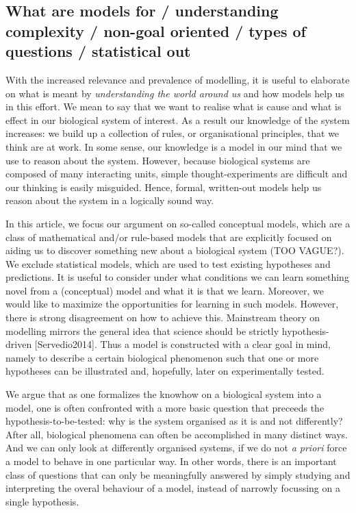\subsection{What are models for / understanding complexity / non-goal oriented / types of questions / statistical out}

With the increased relevance and prevalence of modelling, it is useful to elaborate on what is meant by \emph{understanding the world around us} and how models help us in this effort. We mean to say that we want to realise what is cause and what is effect in our biological system of interest. As a result our knowledge of the system increases: we build up a collection of rules, or organisational principles, that we think are at work. In some sense, our knowledge is a model in our mind that we use to reason about the system. However, because biological systems are composed of many interacting units, simple thought-experiments are difficult and our thinking is easily misguided. Hence, formal, written-out models help us reason about the system in a logically sound way.

In this article, we focus our argument on so-called conceptual models, which are a class of mathematical and/or rule-based models that are explicitly focused on aiding us to discover something new about a biological system (TOO VAGUE?). We exclude statistical models, which are used to test existing hypotheses and predictions. It is useful to consider under what conditions we can learn something novel from a (conceptual) model and what it is that we learn. Moreover, we would like to maximize the opportunities for learning in such models. However, there is strong disagreement on how to achieve this. Mainstream theory on modelling mirrors the general idea that science should be strictly hypothesis-driven [Servedio2014]. Thus a model is constructed with a clear goal in mind, namely to describe a certain biological phenomenon such that one or more hypotheses can be illustrated and, hopefully, later on experimentally tested.

We argue that as one formalizes the knowhow on a biological system into a model, one is often confronted with a more basic question that preceeds the hypothesis-to-be-tested: why is the system organised as it is and not differently? After all, biological phenomena can often be accomplished in many distinct ways. And we can only look at differently organised systems, if we do not \emph{a priori} force a model to behave in one particular way. In other words, there is an important class of questions that can only be meaningfully answered by simply studying and interpreting the overal behaviour of a model, instead of narrowly focussing on a single hypothesis.
